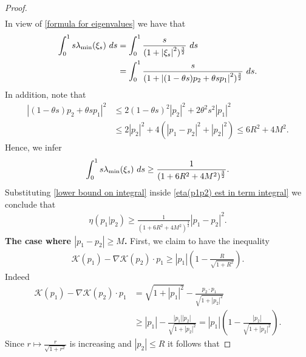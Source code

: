 \documentclass[10pt,a4paper]{amsart}
\def\dd{{\rm d}}
\begin{document}
\begin{proof}
\begin{align}
\end{align}
In view of \eqref{formula for eigenvalues} we have that 
\begin{align*}
\int_{0}^{1}s\lambda_{\min}(\xi_{s})\ \dd s&=\int_{0}^{1}\frac{s}{(1+\left\vert \xi_{s}\right\vert^{2})^{\frac{3}{2}}}\ \dd s\\
&=\int_{0}^{1}\frac{s}{(1+\left\vert (1-\theta s)p_{2}+\theta s p_{1}\right\vert^{2})^{\frac{3}{2}}}\ \dd s.    \end{align*}
In addition, note that  
\begin{align*}
\left\vert (1-\theta s)p_{2}+\theta sp_{1}\right\vert^{2}&\leq 2(1-\theta s)^{2}\left\vert p_{2}\right\vert^{2}+2\theta^{2}s^{2} \left\vert p_{1}\right\vert^{2}\\
&\leq 2\left\vert p_{2}\right\vert^{2}+4(\left\vert p_{1}-p_{2}\right\vert^{2}+\left\vert p_{2}\right\vert^{2} 
)\leq 6R^{2}+4M^{2}.     \end{align*}
Hence, we infer  
\begin{align}
\int_{0}^{1} s\lambda_{\min}(\xi_{s})\ \dd s\geq \frac{1}{(1+6R^{2}+4M^{2})^{\frac{3}{2}}}. \label{lower bound on integral}    
\end{align}
Substituting \eqref{lower bound on integral} inside \eqref{eta(p1p2) est in term integral} we conclude that 
\begin{align}
\eta(p_{1}\vert p_{2})\geq \frac{1}{(1+6R^{2}+4M^{2})^{\frac{3}{2}}}\left\vert p_{1}-p_{2}\right\vert^{2}. \label{quadratic est on eta}   
\end{align}
\textbf{The case where $\left\vert p_{1}-p_{2}\right\vert\geq M $.} First, we claim to have the inequality 
\begin{align}
\mathscr{K}(p_{1})-\nabla \mathscr{K}(p_{2})\cdot p_{1}\geq \left\vert p_{1}\right\vert\left(1-\frac{R}{\sqrt{1+R^{2}}}\right).\label{inequality for K}     
\end{align}
Indeed 
\begin{align*}
\mathscr{K}(p_{1})-\nabla \mathscr{K}(p_{2})\cdot p_{1}&=\sqrt{1+\left\vert p_{1}\right\vert^{2}}-\frac{p_{2}\cdot p_{1}}{\sqrt{1+\left\vert p_{2}\right\vert^{2}  }}\\
&\geq \left\vert p_{1}\right\vert-\frac{\left\vert p_{1}\right\vert\left\vert p_{2}\right\vert  }{\sqrt{1+\left\vert p_{2}\right\vert^{2}}}=\left\vert p_{1}\right\vert\left(1-\frac{\left\vert p_{2}\right\vert}{\sqrt{1+\left\vert p_{2}\right\vert^{2} }}\right).       
\end{align*}
Since $r\mapsto \frac{r}{\sqrt{1+r^{2}}}$ is increasing and $\left\vert p_{2}\right\vert\leq R$ it follows that 

\end{proof}
\end{document}
